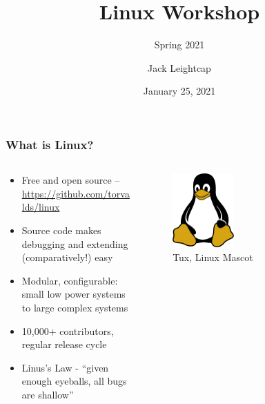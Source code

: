 \documentclass{beamer} \usetheme{Madrid}
\title{Linux Workshop}
\subtitle{Spring 2021}
\author[]{Jack Leightcap\inst{1}\inst{2}}
\institute[IEEE, Wireless Club]{
    \inst{1}IEEE -- \url{nuieeeofficers@gmail.com}
    \and
    \inst{2}Wireless Club -- \url{nuwirelessclub@gmail.com}
}
\date[Fall 2020]{January 25, 2021}
\begin{document}
\frame{\titlepage}

\begin{frame}
    \frametitle{What is Linux?}
    \begin{columns}
        \begin{column}{0.6\textwidth}
            \begin{itemize}
                \item Free and open source -- \url{https://github.com/torvalds/linux}
                \item Source code makes debugging and extending (comparatively!) easy
                \item Modular, configurable: small low power systems to large complex systems
                \item 10,000+ contributors, regular release cycle
                \item Linus's Law - ``given enough eyeballs, all bugs are shallow''
            \end{itemize}
        \end{column}
        \begin{column}{0.4\textwidth}
            \centering
            \begin{figure}
                \includegraphics[width=0.4\textwidth]{tux.png}
                \caption{Tux, Linux Mascot}
            \end{figure}
        \end{column}
    \end{columns}
\end{frame}
\end{document}
